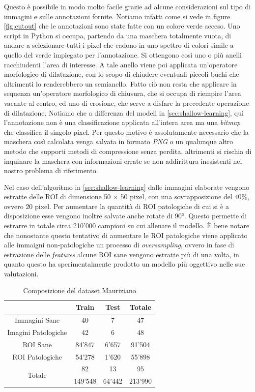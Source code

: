 Questo è possibile in modo molto facile grazie ad alcune
considerazioni sul tipo di immagini e sulle annotazioni fornite.
Notiamo infatti come si vede in figure \ref{fig:cutout} che 
le annotazioni sono state fatte con un colore verde acceso.
Uno script in Python si occupa, partendo da una maschera
totalmente vuota, di andare a selezionare tutti i pixel
che cadono in uno spettro di colori simile a quello del verde
impiegato per l'annotazione.
Si ottengono così uno o più anelli racchiudenti l'area di
interesse.
A tale anello viene poi applicata un'operatore morfologico
di dilatazione, con lo scopo di chiudere eventuali piccoli
buchi che altrimenti lo renderebbero un semianello.
Fatto ciò non resta che applicare in sequenza un'operatore
morfologico di chiusura, che si occupa di riempire
l'area vacante al centro, ed uno di erosione, che serve
a disfare la precedente operazione di dilatazione.
Notiamo che a differenza del modell in \ref{sec:shallow-learning},
qui l'annotazione non è una classificazione applicata all'intera
area ma una {\it bitmap} che classifica il singolo pixel.
Per questo motivo è assolutamente necessario che la maschera
così calcolata venga salvata in formato {\it PNG} o
un qualunque altro metodo che supporti metodi di
compressione senza perdita, altrimenti si rischia di
inquinare la maschera con informazioni errate se non
addirittura inesistenti nel nostro problema di riferimento.


Nel caso dell'algoritmo in \ref{sec:shallow-learning} dalle immagini
elaborate vengono estratte delle ROI di dimensione 50 $\times$ 50 pixel,
con una sovrapposizione del 40\%, ovvero 20 pixel.
Per aumentare la quantità di ROI patologiche di cui si è a disposizione
esse vengono inoltre salvate anche rotate di 90°.
Questo permette di estrarre in totale circa 210'000 campioni su cui allenare
il modello.
È bene notare che nonostante questo tentativo di aumentare le ROI
patologiche viene applicato alle immaigni non-patologiche un processo
di {\it oversampling}, ovvero in fase di estrazione delle {\it features}
alcune ROI sane vengono estratte più di una volta, in quanto questo
ha sperimentalmente prodotto un modello più oggettivo nelle sue
valutazioni.

\begin{table}
    \center
    \begin{tabular}[h]{||c||c|c|c||}
        \hline
        & Train & Test & Totale \\
        \hline
        Immagini Sane & 40 & 7 & 47 \\
        \hline
        Imagini Patologiche & 42 & 6 & 48 \\
        \hline
        ROI Sane & 84'847 & 6'657 & 91'504 \\
        \hline
        ROI Patologiche & 54'278 & 1'620 & 55'898\\
        \hline
        \hline
        \multirow{2}{*}{Totale} & 82 & 13 & 95 \\ \cline{2-4}
        & 149'548 & 64'442 & 213'990 \\
        \hline
    \end{tabular}
    \caption{\label{tab:mauriziano}Composizione del dataset Mauriziano}
\end{table}


